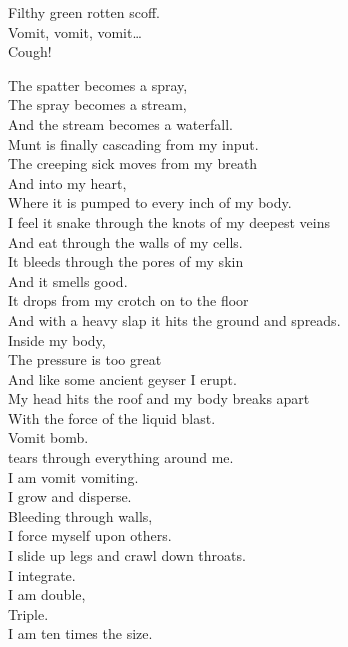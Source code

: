 Filthy green rotten scoff. \\
Vomit, vomit, vomit… \\
Cough! \\





The spatter becomes a spray, \\
The spray becomes a stream, \\
And the stream becomes a waterfall. \\
Munt is finally cascading from my input. \\

The creeping sick moves from my breath \\
And into my heart, \\
Where it is pumped to every inch of my body. \\
I feel it snake through the knots of my deepest veins \\
And eat through the walls of my cells. \\

It bleeds through the pores of my skin \\
And it smells good. \\
It drops from my crotch on to the floor \\
And with a heavy slap it hits the ground and spreads. \\

Inside my body, \\
The pressure is too great \\
And like some ancient geyser I erupt. \\
My head hits the roof and my body breaks apart \\
With the force of the liquid blast. \\

Vomit bomb. \\
 tears through everything around me. \\
I am vomit vomiting. \\
I grow and disperse. \\

Bleeding through walls, \\
I force myself upon others. \\
I slide up legs and crawl down throats. \\
I integrate. \\
I am double, \\
Triple. \\
I am ten times the size. \\

